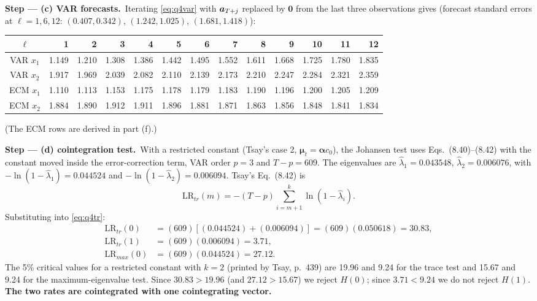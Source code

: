 \documentclass[11pt,a4paper]{article}
\newcommand{\passo}[2]{\par\smallskip\noindent\textbf{Step --- #1.}~#2}
\newcommand{\bmu}{\bm{\mu}}\newcommand{\bphi}{\bm{\phi}}\newcommand{\bSigma}{\bm{\Sigma}}
\begin{document}
\begin{sol}
\passo{(c) VAR forecasts}{Iterating \eqref{eq:q4var} with $\bm{a}_{T+j}$ replaced by $\bm0$ from the last three
observations gives (forecast standard errors at $\ell=1,6,12$: $(0.407,0.342)$, $(1.242,1.025)$, $(1.681,1.418)$):}
\begin{center}\small
\begin{tabular}{c|rrrrrrrrrrrr}
\toprule
$\ell$ & 1 & 2 & 3 & 4 & 5 & 6 & 7 & 8 & 9 & 10 & 11 & 12\\
\midrule
VAR $x_1$ & 1.149 & 1.210 & 1.308 & 1.386 & 1.442 & 1.495 & 1.552 & 1.611 & 1.668 & 1.725 & 1.780 & 1.835\\
VAR $x_2$ & 1.917 & 1.969 & 2.039 & 2.082 & 2.110 & 2.139 & 2.173 & 2.210 & 2.247 & 2.284 & 2.321 & 2.359\\
ECM $x_1$ & 1.110 & 1.113 & 1.153 & 1.175 & 1.178 & 1.179 & 1.183 & 1.190 & 1.196 & 1.200 & 1.205 & 1.209\\
ECM $x_2$ & 1.884 & 1.890 & 1.912 & 1.911 & 1.896 & 1.881 & 1.871 & 1.863 & 1.856 & 1.848 & 1.841 & 1.834\\
\bottomrule
\end{tabular}
\end{center}
(The ECM rows are derived in part (f).)

\passo{(d) cointegration test}{With a restricted constant (Tsay's case 2, $\bmu_t=\bm\alpha c_0$), the
Johansen test uses Eqs.~(8.40)--(8.42) with the constant moved inside the error-correction term, VAR order
$p=3$ and $T-p=609$. The eigenvalues are $\hat\lambda_1=0.043548$, $\hat\lambda_2=0.006076$, with
$-\ln(1-\hat\lambda_1)=0.044524$ and $-\ln(1-\hat\lambda_2)=0.006094$. Tsay's Eq.~(8.42) is
\begin{equation}
\mathrm{LR}_{tr}(m)=-(T-p)\sum_{i=m+1}^{k}\ln(1-\hat\lambda_i).\label{eq:q4tr}
\end{equation}
Substituting into \eqref{eq:q4tr}:
\begin{align}
\mathrm{LR}_{tr}(0)&=(609)\left[(0.044524)+(0.006094)\right]=(609)(0.050618)=30.83,\nonumber\\
\mathrm{LR}_{tr}(1)&=(609)(0.006094)=3.71,\nonumber\\
\mathrm{LR}_{max}(0)&=(609)(0.044524)=27.12.\nonumber
\end{align}
The 5\% critical values for a restricted constant with $k=2$ (printed by Tsay, p.~439) are 19.96 and
9.24 for the trace test and 15.67 and 9.24 for the maximum-eigenvalue test. Since $30.83>19.96$
(and $27.12>15.67$) we reject $H(0)$; since $3.71<9.24$ we do not reject $H(1)$. \textbf{The two rates are
cointegrated with one cointegrating vector.}}


\end{sol}
\end{document}
